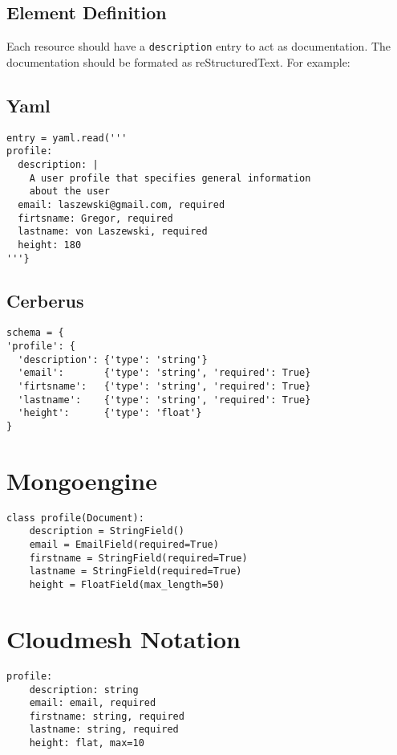 \documentclass[9pt,twocolumn,twoside]{styles/osajnl}
\begin{document}
\subsection{Element Definition}

Each resource should have a \verb+description+ entry to act as
documentation. The documentation should be formated as
reStructuredText. For example:

\subsection{Yaml}

\begin{Verbatim}
entry = yaml.read('''
profile:
  description: |
    A user profile that specifies general information 
    about the user
  email: laszewski@gmail.com, required
  firtsname: Gregor, required
  lastname: von Laszewski, required
  height: 180
'''}
\end{Verbatim}

\subsection{Cerberus}

\begin{Verbatim}
schema = {
'profile': {
  'description': {'type': 'string'}
  'email':       {'type': 'string', 'required': True}
  'firtsname':   {'type': 'string', 'required': True}
  'lastname':    {'type': 'string', 'required': True}
  'height':      {'type': 'float'}
}
\end{Verbatim}

\section{Mongoengine}

\begin{Verbatim}
class profile(Document):
    description = StringField()
    email = EmailField(required=True)
    firstname = StringField(required=True)
    lastname = StringField(required=True)
    height = FloatField(max_length=50)
\end{Verbatim}

\section{Cloudmesh Notation}

\begin{Verbatim}
profile:
    description: string
    email: email, required
    firstname: string, required
    lastname: string, required
    height: flat, max=10
\end{Verbatim}
\end{document}
